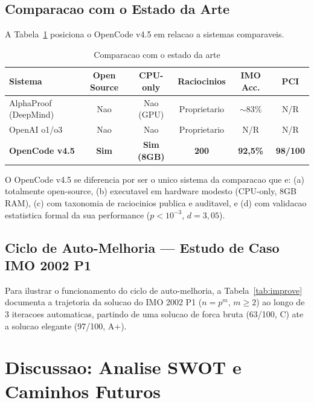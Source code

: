 \documentclass[5p]{elsarticle}
\begin{document}
\subsection{Comparacao com o Estado da Arte}

A Tabela~\ref{tab:sota} posiciona o OpenCode v4.5 em relacao a sistemas
comparaveis.

\begin{table}[H]
  \centering
  \caption{Comparacao com o estado da arte}
  \label{tab:sota}
  \small
  \begin{tabular}{lccccc}
    \toprule
    \textbf{Sistema} & \textbf{Open Source} & \textbf{CPU-only} & \textbf{Raciocinios} & \textbf{IMO Acc.} & \textbf{PCI} \\
    \midrule
    AlphaProof (DeepMind) & Nao & Nao (GPU) & Proprietario & $\sim$83\% & N/R \\
    OpenAI o1/o3 & Nao & Nao & Proprietario & N/R & N/R \\
    \rowcolor{greenbg} \textbf{OpenCode v4.5} & \textbf{Sim} & \textbf{Sim (8GB)} & \textbf{200} & \textbf{92,5\%} & \textbf{98/100} \\
    \bottomrule
  \end{tabular}
\end{table}

O OpenCode v4.5 se diferencia por ser o unico sistema da comparacao que e:
(a) totalmente open-source, (b) executavel em hardware modesto (CPU-only,
8GB RAM), (c) com taxonomia de raciocinios publica e auditavel, e (d) com
validacao estatistica formal da sua performance ($p<10^{-3}$, $d=3,05$).

\subsection{Ciclo de Auto-Melhoria — Estudo de Caso IMO 2002 P1}

Para ilustrar o funcionamento do ciclo de auto-melhoria, a Tabela~\ref{tab:improve}
documenta a trajetoria da solucao do IMO 2002 P1 ($n=p^m$, $m\geq 2$) ao longo
de 3 iteracoes automaticas, partindo de uma solucao de forca bruta (63/100, C)
ate a solucao elegante (97/100, A+).

\section{Discussao: Analise SWOT e Caminhos Futuros}
\end{document}
